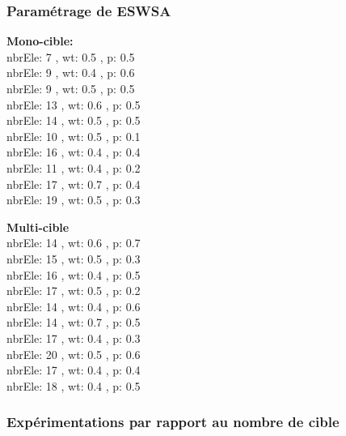 \subsubsection{Paramétrage de ESWSA}
\noindent
\begin{minipage}[t]{0.55\textwidth}
	\textbf{Mono-cible:} \\
nbrEle: 7 , wt: 0.5 , p: 0.5\\
nbrEle: 9 , wt: 0.4 , p: 0.6\\
nbrEle: 9 , wt: 0.5 , p: 0.5\\
nbrEle: 13 , wt: 0.6 , p: 0.5\\
nbrEle: 14 , wt: 0.5 , p: 0.5\\
nbrEle: 10 , wt: 0.5 , p: 0.1\\
nbrEle: 16 , wt: 0.4 , p: 0.4\\
nbrEle: 11 , wt: 0.4 , p: 0.2\\
nbrEle: 17 , wt: 0.7 , p: 0.4\\
nbrEle: 19 , wt: 0.5 , p: 0.3
	
	
\end{minipage}\hfill
\hspace{0.2cm}
\begin{minipage}[t]{0.55\textwidth}
	\textbf{Multi-cible}\\
nbrEle: 14 , wt: 0.6 , p: 0.7\\
nbrEle: 15 , wt: 0.5 , p: 0.3\\
nbrEle: 16 , wt: 0.4 , p: 0.5\\
nbrEle: 17 , wt: 0.5 , p: 0.2\\
nbrEle: 14 , wt: 0.4 , p: 0.6\\
nbrEle: 14 , wt: 0.7 , p: 0.5\\
nbrEle: 17 , wt: 0.4 , p: 0.3\\
nbrEle: 20 , wt: 0.5 , p: 0.6\\
nbrEle: 17 , wt: 0.4 , p: 0.4\\
nbrEle: 18 , wt: 0.4 , p: 0.5
	
	
	
	
\end{minipage}\hfill


\subsubsection{Expérimentations par rapport au nombre de cible}

